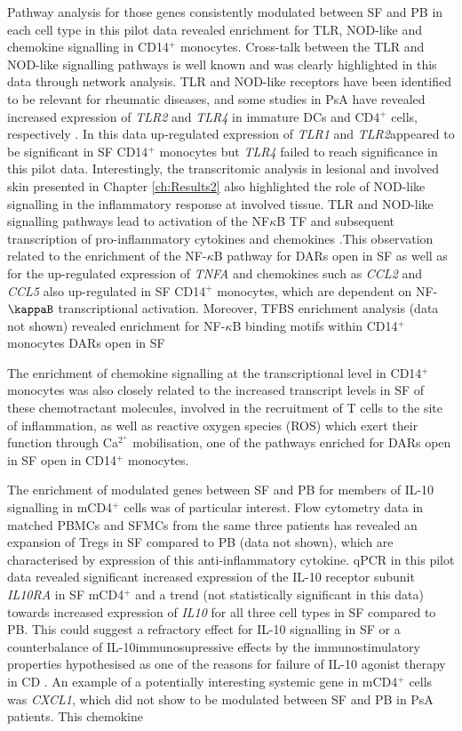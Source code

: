Pathway analysis for those genes consistently modulated between SF and PB in each cell type in this pilot data revealed enrichment for TLR, NOD-like and chemokine signalling in CD14$^+$ monocytes. Cross-talk between the TLR and NOD-like signalling pathways is well known and was clearly highlighted in this data through network analysis. TLR and NOD-like receptors have been identified to be relevant for rheumatic diseases, and some studies in PsA have revealed increased expression of \textit{TLR2} and \textit{TLR4} in immature DCs and CD4$^+$ cells, respectively \parencite{Candia2007,Raffeiner2005}. In this data up-regulated expression of \textit{TLR1} and \textit{TLR2}appeared to be significant in SF CD14$^+$ monocytes but \textit{TLR4} failed to reach significance in this pilot data. Interestingly, the transcritomic analysis in lesional and involved skin presented in Chapter \ref{ch:Results2} also highlighted the role of NOD-like signalling in the inflammatory response at involved tissue. TLR and NOD-like signalling pathways lead to activation of the NF$\kappa$B TF and subsequent transcription of pro-inflammatory cytokines and chemokines \parencite{Mitchell2010}.This observation related to the enrichment of the NF-$\kappa$B pathway for DARs open in SF as well as for the up-regulated expression of \textit{TNFA} and chemokines such as \textit{CCL2} and \textit{CCL5} also up-regulated in SF CD14$^+$ monocytes, which are dependent on NF-$\kappaB$ transcriptional activation. Moreover, TFBS enrichment analysis (data not shown) revealed enrichment for NF-$\kappa$B binding motifs within CD14$^+$ monocytes DARs open in SF 

The enrichment of chemokine signalling at the transcriptional level in CD14$^+$ monocytes was also closely related to the increased transcript levels in SF of these chemotractant molecules, involved in the recruitment of T cells to the site of inflammation, as well as reactive oxygen species (ROS) which exert their function through Ca$^{2^+}$ mobilisation, one of the pathways enriched for DARs open in SF open in CD14$^+$ monocytes.

The enrichment of modulated genes between SF and PB for members of IL-10 signalling in mCD4$^+$ cells was of particular interest. Flow cytometry data in matched PBMCs and SFMCs from the same three patients has revealed an expansion of Tregs in SF compared to PB (data not shown), which are characterised by expression of this anti-inflammatory cytokine. qPCR in this pilot data revealed significant increased expression of the IL-10 receptor subunit \textit{IL10RA} in SF mCD4$^+$ and a trend (not statistically significant in this data) towards increased expression of \textit{IL10} for all three cell types in SF compared to PB. This could suggest a refractory effect for IL-10 signalling in SF or a counterbalance of IL-10immunosupressive effects by the immunostimulatory properties hypothesised as one of the reasons for failure of IL-10 agonist therapy in CD \parencite{Marlow2013}. An example of a potentially interesting systemic gene in mCD4$^+$ cells was \textit{CXCL1}, which did not show to be modulated between SF and PB in PsA patients. This chemokine

